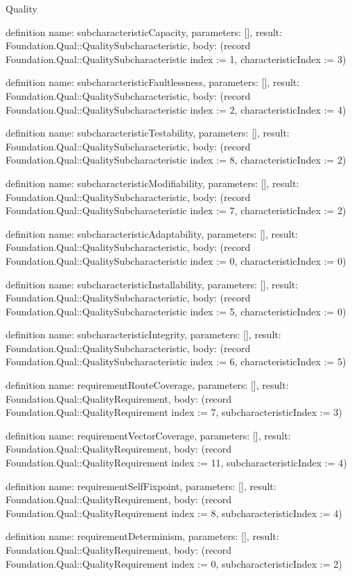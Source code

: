 \begin{lexlean}{Quality}
\begin{semanticmodule}
definition{
  name: subcharacteristicCapacity,
  parameters: [],
  result: Foundation.Qual::QualitySubcharacteristic,
  body: (record Foundation.Qual::QualitySubcharacteristic {index := 1, characteristicIndex := 3})
}

definition{
  name: subcharacteristicFaultlessness,
  parameters: [],
  result: Foundation.Qual::QualitySubcharacteristic,
  body: (record Foundation.Qual::QualitySubcharacteristic {index := 2, characteristicIndex := 4})
}

definition{
  name: subcharacteristicTestability,
  parameters: [],
  result: Foundation.Qual::QualitySubcharacteristic,
  body: (record Foundation.Qual::QualitySubcharacteristic {index := 8, characteristicIndex := 2})
}

definition{
  name: subcharacteristicModifiability,
  parameters: [],
  result: Foundation.Qual::QualitySubcharacteristic,
  body: (record Foundation.Qual::QualitySubcharacteristic {index := 7, characteristicIndex := 2})
}

definition{
  name: subcharacteristicAdaptability,
  parameters: [],
  result: Foundation.Qual::QualitySubcharacteristic,
  body: (record Foundation.Qual::QualitySubcharacteristic {index := 0, characteristicIndex := 0})
}

definition{
  name: subcharacteristicInstallability,
  parameters: [],
  result: Foundation.Qual::QualitySubcharacteristic,
  body: (record Foundation.Qual::QualitySubcharacteristic {index := 5, characteristicIndex := 0})
}

definition{
  name: subcharacteristicIntegrity,
  parameters: [],
  result: Foundation.Qual::QualitySubcharacteristic,
  body: (record Foundation.Qual::QualitySubcharacteristic {index := 6, characteristicIndex := 5})
}

definition{
  name: requirementRouteCoverage,
  parameters: [],
  result: Foundation.Qual::QualityRequirement,
  body: (record Foundation.Qual::QualityRequirement {index := 7, subcharacteristicIndex := 3})
}

definition{
  name: requirementVectorCoverage,
  parameters: [],
  result: Foundation.Qual::QualityRequirement,
  body: (record Foundation.Qual::QualityRequirement {index := 11, subcharacteristicIndex := 4})
}

definition{
  name: requirementSelfFixpoint,
  parameters: [],
  result: Foundation.Qual::QualityRequirement,
  body: (record Foundation.Qual::QualityRequirement {index := 8, subcharacteristicIndex := 4})
}

definition{
  name: requirementDeterminism,
  parameters: [],
  result: Foundation.Qual::QualityRequirement,
  body: (record Foundation.Qual::QualityRequirement {index := 0, subcharacteristicIndex := 2})
}


\end{semanticmodule}
\end{lexlean}
